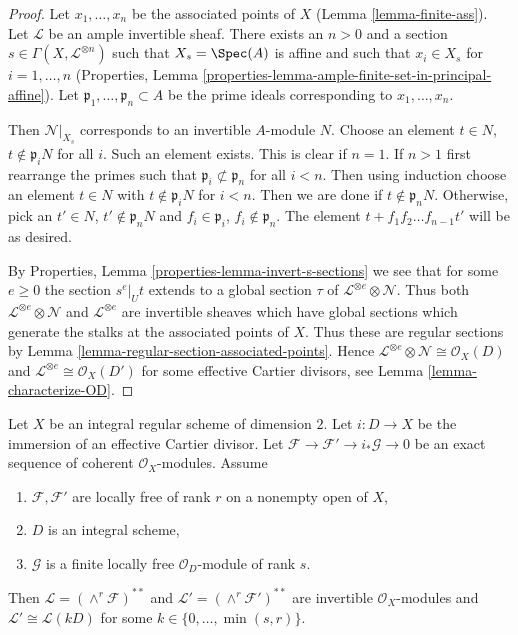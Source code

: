 \begin{proof}
Let $x_1, \ldots, x_n$ be the associated points of $X$
(Lemma \ref{lemma-finite-ass}). Let $\mathcal{L}$ be an ample invertible sheaf.
There exists an $n > 0$ and a section
$s \in \Gamma(X, \mathcal{L}^{\otimes n})$ such that $X_s = \Spec(A)$
is affine and such that $x_i \in X_s$ for $i = 1, \ldots, n$
(Properties, Lemma \ref{properties-lemma-ample-finite-set-in-principal-affine}).
Let $\mathfrak p_1, \ldots, \mathfrak p_n \subset A$ be the
prime ideals corresponding to $x_1, \ldots, x_n$.

\medskip\noindent
Then $\mathcal{N}|_{X_s}$ corresponds to an invertible $A$-module $N$.
Choose an element $t \in N$, $t \not \in \mathfrak p_iN$ for all $i$.
Such an element exists. This is clear if $n = 1$. If $n > 1$ first
rearrange the primes such that $\mathfrak p_i \not \subset \mathfrak p_n$
for all $i < n$. Then using induction choose an element
$t \in N$ with $t \not \in \mathfrak p_i N$ for $i < n$.
Then we are done if $t \not \in \mathfrak p_nN$. Otherwise, pick an
$t' \in N$, $t' \not \in \mathfrak p_nN$ and $f_i \in \mathfrak p_i$,
$f_i \not \in \mathfrak p_n$. The element $t + f_1 f_2 \ldots f_{n - 1}t'$
will be as desired.

\medskip\noindent
By Properties, Lemma \ref{properties-lemma-invert-s-sections}
we see that for some $e \geq 0$ the section $s^e|_U t$ extends to
a global section $\tau$ of $\mathcal{L}^{\otimes e} \otimes \mathcal{N}$.
Thus both $\mathcal{L}^{\otimes e} \otimes \mathcal{N}$ and
$\mathcal{L}^{\otimes e}$ are invertible sheaves which have global sections
which generate the stalks at the associated points of $X$.
Thus these are regular sections by
Lemma \ref{lemma-regular-section-associated-points}.
Hence $\mathcal{L}^{\otimes e} \otimes \mathcal{N} \cong \mathcal{O}_X(D)$
and $\mathcal{L}^{\otimes e} \cong \mathcal{O}_X(D')$ for some
effective Cartier divisors, see Lemma \ref{lemma-characterize-OD}.
\end{proof}

\begin{lemma}
\label{lemma-wedge-product-ses}
Let $X$ be an integral regular scheme of dimension $2$.
Let $i : D \to X$ be the immersion of an effective Cartier divisor.
Let $\mathcal{F} \to \mathcal{F}' \to i_*\mathcal{G} \to 0$
be an exact sequence of coherent $\mathcal{O}_X$-modules.
Assume
\begin{enumerate}
\item $\mathcal{F}, \mathcal{F}'$ are locally free of rank $r$ on a nonempty
open of $X$,
\item $D$ is an integral scheme,
\item $\mathcal{G}$ is a finite locally free $\mathcal{O}_D$-module
of rank $s$.
\end{enumerate}
Then $\mathcal{L} = (\wedge^r\mathcal{F})^{**}$ and
$\mathcal{L}' = (\wedge^r \mathcal{F}')^{**}$
are invertible $\mathcal{O}_X$-modules and
$\mathcal{L}' \cong \mathcal{L}(k D)$ for some
$k \in \{0, \ldots, \min(s, r)\}$.
\end{lemma}

